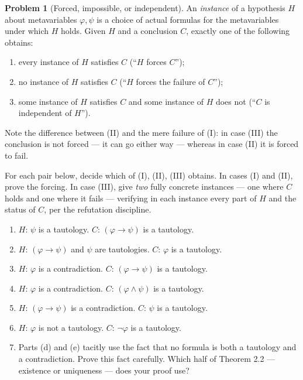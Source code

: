 \documentclass[11pt]{article}
\theoremstyle{definition}
\newtheorem{problem}{Problem}
\begin{document}
\begin{problem}[Forced, impossible, or independent]
An \emph{instance} of a hypothesis $H$ about metavariables $\varphi,\psi$ is a
choice of actual formulas for the metavariables under which $H$ holds. Given $H$
and a conclusion $C$, exactly one of the following obtains:
\begin{enumerate}
\item[(I)] every instance of $H$ satisfies $C$ \quad (``$H$ forces $C$'');
\item[(II)] no instance of $H$ satisfies $C$ \quad (``$H$ forces the failure of
$C$'');
\item[(III)] some instance of $H$ satisfies $C$ and some instance of $H$ does not
\quad (``$C$ is independent of $H$'').
\end{enumerate}
Note the difference between (II) and the mere failure of (I): in case (III) the
conclusion is not forced --- it can go either way --- whereas in case (II) it is
forced to fail.

For each pair below, decide which of (I), (II), (III) obtains. In cases (I) and
(II), prove the forcing. In case (III), give \emph{two} fully concrete instances
--- one where $C$ holds and one where it fails --- verifying in each instance
every part of $H$ and the status of $C$, per the refutation discipline.
\begin{enumerate}
\item[(a)] $H$: $\psi$ is a tautology. \quad $C$: $(\varphi\to\psi)$ is a
tautology.
\item[(b)] $H$: $(\varphi\to\psi)$ and $\psi$ are tautologies. \quad $C$:
$\varphi$ is a tautology.
\item[(c)] $H$: $\varphi$ is a contradiction. \quad $C$: $(\varphi\to\psi)$ is a
tautology.
\item[(d)] $H$: $\varphi$ is a contradiction. \quad $C$: $(\varphi\land\psi)$ is a
tautology.
\item[(e)] $H$: $(\varphi\to\psi)$ is a contradiction. \quad $C$: $\psi$ is a
tautology.
\item[(f)] $H$: $\varphi$ is not a tautology. \quad $C$: $\lnot\varphi$ is a
tautology.
\item[(g)] Parts (d) and (e) tacitly use the fact that no formula is both a
tautology and a contradiction. Prove this fact carefully. Which half of Theorem
2.2 --- existence or uniqueness --- does your proof use?
\end{enumerate}
\end{problem}
\end{document}
